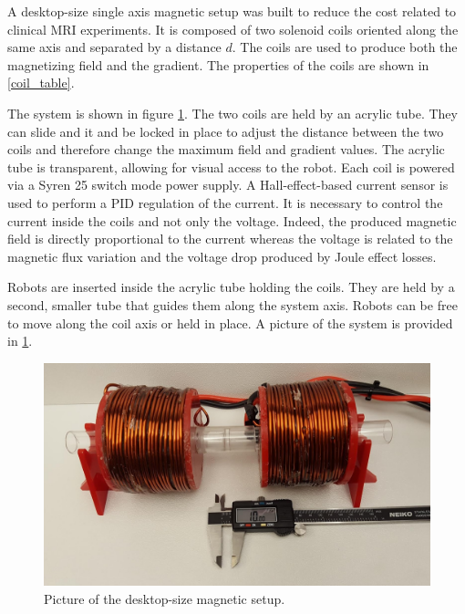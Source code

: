 \documentclass[letterpaper, 10 pt, conference]{ieeeconf}  %
\begin{document}
A desktop-size single axis magnetic setup was built to reduce the cost related to clinical MRI experiments. It is composed of two solenoid coils oriented along the same axis and separated by a distance $d$. The coils are used to produce both the magnetizing field and the gradient. The properties of the coils are shown in \cref{coil_table}.\par
The system is shown in figure \cref{magnetic_setup}. The two coils are held by an acrylic tube. They can slide and it and be locked in place to adjust the distance between the two coils and therefore change the maximum field and gradient values. The acrylic tube is transparent, allowing for visual access to the robot.
Each coil is powered via a Syren 25 switch mode power supply. A Hall-effect-based current sensor is used to perform a PID regulation of the current. It is necessary to control the current inside the coils and not only the voltage. Indeed, the produced magnetic field is directly proportional to the current whereas the voltage is related to the magnetic flux variation and the voltage drop produced by Joule effect losses.\par
Robots are inserted inside the acrylic tube holding the coils. They are held by a second, smaller tube that guides them along the system axis. Robots can be free to move along the coil axis or held in place. A picture of the system is provided in \cref{magnetic_setup}.

\begin{figure}
  \includegraphics[width=\linewidth]{Magnetic_setup.jpg}
  \caption{Picture of the desktop-size magnetic setup.}
  \label{magnetic_setup}
\end{figure}
\end{document}
